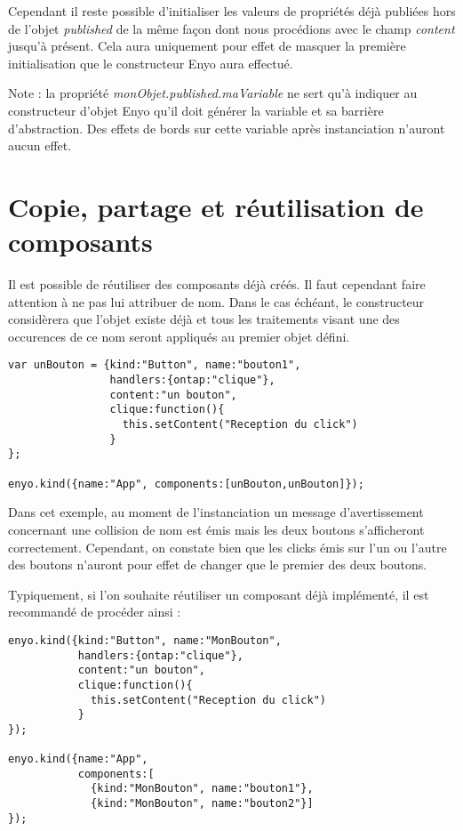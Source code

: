 \documentclass[11pt,a4paper]{report}
\begin{document}

Cependant il reste possible d'initialiser les valeurs de propriétés 
déjà publiées hors de l'objet \emph{published} de la même façon dont nous procédions 
avec le champ \emph{content} jusqu'à présent. Cela aura uniquement pour effet de  masquer la première 
initialisation que le constructeur Enyo aura effectué.

Note : la propriété \emph{monObjet.published.maVariable} ne sert qu'à indiquer au 
constructeur d'objet Enyo qu'il doit générer la variable et sa barrière d'abstraction. 
Des effets de bords sur cette variable après instanciation n'auront aucun effet. 

\section{Copie, partage et réutilisation de composants}

Il est possible de réutiliser des composants déjà créés. Il faut cependant faire attention à ne pas
lui attribuer de nom. Dans le cas échéant, le constructeur considèrera que l'objet existe déjà et 
tous les traitements visant une des occurences de ce nom seront appliqués au premier objet défini.

\begin{lstlisting}
var unBouton = {kind:"Button", name:"bouton1", 
                handlers:{ontap:"clique"}, 
                content:"un bouton",
                clique:function(){
                  this.setContent("Reception du click")
                }
};

enyo.kind({name:"App", components:[unBouton,unBouton]});
\end{lstlisting}

Dans cet exemple, au moment de l'instanciation un message d'avertissement concernant une collision de nom 
est émis mais les deux boutons s'afficheront correctement. Cependant, on constate bien que les clicks 
émis sur l'un ou l'autre des boutons n'auront pour effet de changer que le premier des deux boutons.\\\medskip

Typiquement, si l'on souhaite réutiliser un composant déjà implémenté,
il est recommandé de procéder ainsi :

\begin{lstlisting}
enyo.kind({kind:"Button", name:"MonBouton", 
           handlers:{ontap:"clique"}, 
           content:"un bouton",
           clique:function(){
             this.setContent("Reception du click")
           }
});

enyo.kind({name:"App", 
           components:[
             {kind:"MonBouton", name:"bouton1"},
             {kind:"MonBouton", name:"bouton2"}]
});
\end{lstlisting}
\end{document}
